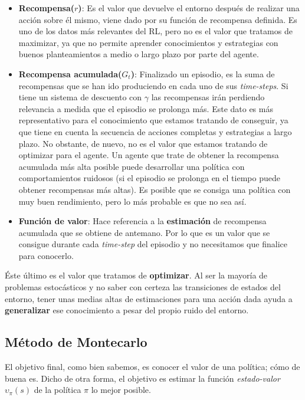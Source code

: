 \documentclass[11pt,fleqn]{book} %
\begin{document}
\begin{itemize}
	\item \textbf{Recompensa($r$)}: Es el valor que devuelve el entorno después de realizar una acción sobre él mismo, viene dado por su función de recompensa definida. Es uno de los datos más relevantes del RL, pero no es el valor que tratamos de maximizar, ya que no permite aprender conocimientos y estrategias con buenos planteamientos a medio o largo plazo por parte del agente. \\
	
	\item \textbf{Recompensa acumulada($G_t$)}: Finalizado un episodio, es la suma de recompensas que se han ido produciendo en cada uno de sus \textit{time-steps}. Si tiene un sistema de descuento con $\gamma$ las recompensas irán perdiendo relevancia a medida que el episodio se prolonga más. Este dato es más representativo para el conocimiento que estamos tratando de conseguir, ya que tiene en cuenta la secuencia de acciones completas y estrategias a largo plazo. No obstante, de nuevo, no es el valor que estamos tratando de optimizar para el agente. Un agente que trate de obtener la recompensa acumulada más alta posible puede desarrollar una política con comportamientos ruidosos (si el episodio se prolonga en el tiempo puede obtener recompensas más altas). Es posible que se consiga una política con muy buen rendimiento, pero lo más probable es que no sea así.\\
	
	\item \textbf{Función de valor}: Hace referencia a la \textbf{estimación} de recompensa acumulada que se obtiene de antemano. Por lo que es un valor que se consigue durante cada \textit{time-step} del episodio y no necesitamos que finalice para conocerlo.\\
\end{itemize}

Éste último es el valor que tratamos de \textbf{optimizar}. Al ser la mayoría de problemas estocásticos y no saber con certeza las transiciones de estados del entorno, tener unas medias altas de estimaciones para una acción dada ayuda a \textbf{generalizar} ese conocimiento a pesar del propio ruido del entorno.

\subsection{Método de Montecarlo}

El objetivo final, como bien sabemos, es conocer el valor de una política; cómo de buena es. Dicho de otra forma, el objetivo es estimar la función \textit{estado-valor} $\upsilon_\pi(s)$ de la política $\pi$ lo mejor posible. \\
\end{document}
